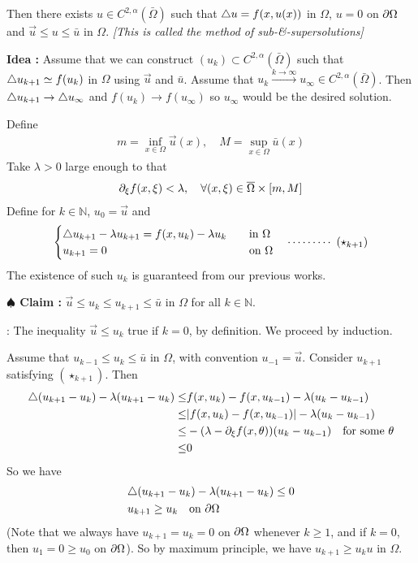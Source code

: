 \documentclass[12pt,a4paper]{article}
\newenvironment{proof}
{\begin{changemargin}{0.5cm}{0.5cm} 
	}%
	{\end{changemargin}
}
\newenvironment{subproof}
{\begin{changemargin}{0.5cm}{0.5cm} 
	}%
	{\end{changemargin}
}
\newenvironment{p}
{\begin{proof} 
	}%
	{\end{proof}
}
\begin{document}
Then there exists $u\in C^{2, \alpha}(\bar{\Omega})$ such that $\triangle u = f(x,u(x))$ in $\Omega$, $u=0$ on $\partial \Omega$ and $\vec{u}\leq u\leq \bar{u}$ in $\Omega$.
\emph{[This is called the method of sub-\&-supersolutions]}
\begin{p}
\textbf{Idea :} Assume that we can construct $(u_k)\subset C^{2, \alpha}(\bar{\Omega})$ such that $\triangle u_{k+1} \simeq f(u_k)$ in $\Omega$ using $\vec{u}$ and $\bar{u}$. Assume that $u_k \xrightarrow{k\rightarrow \infty} u_{\infty} \in C^{2, \alpha}(\bar{\Omega})$. Then $\triangle u_{k+1} \rightarrow \triangle u_{\infty}$ and $f(u_k) \rightarrow f(u_{\infty})$ so $u_{\infty}$ would be the desired solution.
\s

\pf Define
\begin{align*}
m= \inf_{x\in \Omega} \vec{u}(x), \quad M = \sup_{x\in \Omega} \bar{u}(x)
\end{align*}
Take $\lambda >0$ large enough to that
\begin{align*}
\partial_{\xi} f(x,\xi) < \lambda, \quad \forall (x, \xi) \in \overline{\Omega} \times [m, M]
\end{align*}
Define for $k\in \mathbb{N}$, $u_0 = \vec{u}$ and
\begin{align*}
\begin{cases}
\triangle u_{k+1} - \lambda u_{k+1} = f(x, u_k) - \lambda u_k \quad & \text{in }\Omega \\
u_{k+1} =0 \quad & \text{on }\Omega
\end{cases} \quad \cdots\cdots\cdots\,\,(\star_{k+1})
\end{align*}
The existence of such $u_k$ is guaranteed from our previous works.

\textbf{$\spadesuit$ Claim :} $\vec{u} \leq u_k \leq u_{k+1} \leq \bar{u}$ in $\Omega$ for all $k \in \mathbb{N}$.
\begin{subproof}
: The inequality $\vec{u} \leq u_k$ true if $k=0$, by definition. We proceed by induction.

\quad Assume that $u_{k-1} \leq u_k \leq \bar{u}$ in $\Omega$, with convention $u_{-1} = \vec{u}$. Consider $u_{k+1}$ satisfying $(\star_{k+1})$. Then
\begin{align*}
\triangle (u_{k+1} - u_k) - \lambda(u_{k+1}- u_k) \leq & f(x, u_k) - f(x, u_{k-1}) - \lambda(u_k - u_{k-1}) \\
\leq & |f(x, u_k) - f(x, u_{k-1})| - \lambda(u_k- u_{k-1}) \\
\leq & -(\lambda - \partial_{\xi} f(x, \theta)) (u_k - u_{k-1}) \quad \text{for some }\theta \\
\leq & 0
\end{align*}
So we have
\begin{align*}
& \triangle(u_{k+1} - u_{k}) - \lambda(u_{k+1}- u_{k}) \leq 0 \\
& u_{k+1} \geq u_k  \quad \text{on } \partial \Omega
\end{align*}
(Note that we always have $u_{k+1} = u_k =0$ on $\partial \Omega$ whenever $k\geq 1$, and if $k=0$, then $u_1 =0 \geq u_0$ on $\partial \Omega$). So by maximum principle, we have $u_{k+1} \geq u_k{u}$ in $\Omega$.


\end{subproof}
\end{p}
\end{document}
